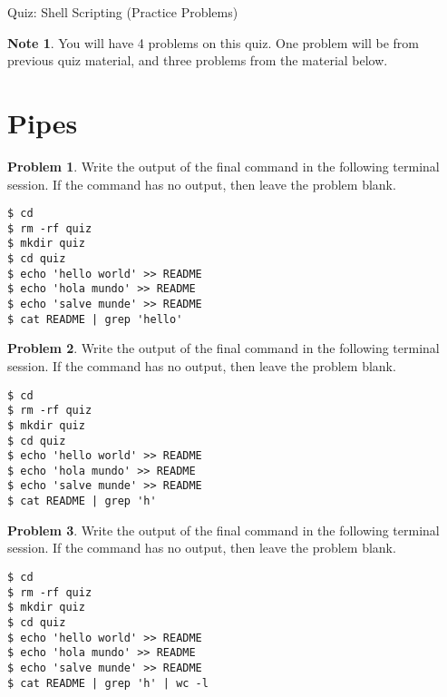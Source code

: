 \documentclass[10pt]{article}
\theoremstyle{definition}
\newtheorem{problem}{Problem}
\newtheorem{note}{Note}
\begin{document}
\begin{center}
    {
\Large
    Quiz: Shell Scripting (Practice Problems)
}

    \vspace{0.1in}
\end{center}

\vspace{0.15in}
\noindent
\begin{note}
    You will have 4 problems on this quiz.
    One problem will be from previous quiz material,
    and three problems from the material below.
\end{note}
\vspace{0.15in}

\section{Pipes}

\begin{problem}
    Write the output of the final command in the following terminal session.
    If the command has no output, then leave the problem blank.
\end{problem}
\begin{lstlisting}
$ cd
$ rm -rf quiz
$ mkdir quiz
$ cd quiz
$ echo 'hello world' >> README
$ echo 'hola mundo' >> README
$ echo 'salve munde' >> README
$ cat README | grep 'hello'
\end{lstlisting}
\vspace{0.4in}

\begin{problem}
    Write the output of the final command in the following terminal session.
    If the command has no output, then leave the problem blank.
\end{problem}
\begin{lstlisting}
$ cd
$ rm -rf quiz
$ mkdir quiz
$ cd quiz
$ echo 'hello world' >> README
$ echo 'hola mundo' >> README
$ echo 'salve munde' >> README
$ cat README | grep 'h'
\end{lstlisting}
\vspace{0.4in}

\begin{problem}
    Write the output of the final command in the following terminal session.
    If the command has no output, then leave the problem blank.
\end{problem}
\begin{lstlisting}
$ cd
$ rm -rf quiz
$ mkdir quiz
$ cd quiz
$ echo 'hello world' >> README
$ echo 'hola mundo' >> README
$ echo 'salve munde' >> README
$ cat README | grep 'h' | wc -l
\end{lstlisting}
\vspace{0.4in}
\end{document}
